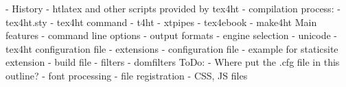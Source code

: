 - History
  - htlatex and other scripts provided by tex4ht
    - compilation process:
      - tex4ht.sty
      - tex4ht command
      - t4ht
      - xtpipes
  - tex4ebook
  - make4ht
Main features
  - command line options
    - output formats
    - engine selection
    - unicode
    - tex4ht configuration file
  - extensions
  - configuration file
    - example for staticsite extension
  - build file
    - filters
    - domfilters
ToDo:
- Where put the .cfg file in this outline?
- font processing
- file registration - CSS, JS files


